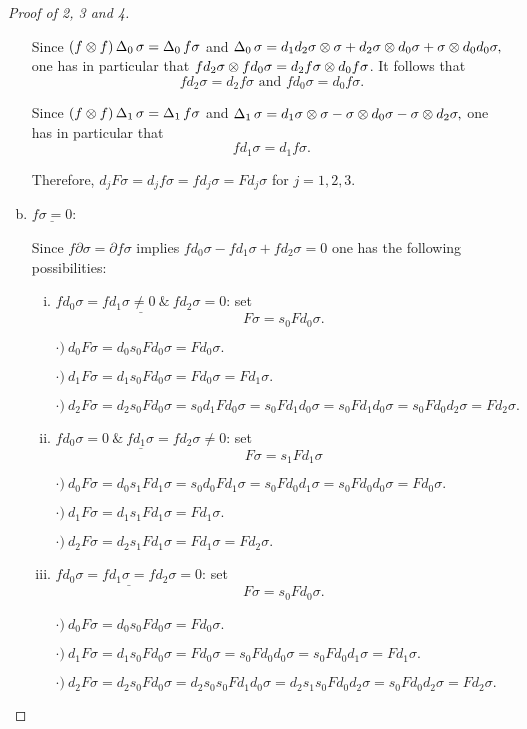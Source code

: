 \documentclass[thesis.tex]{subfiles}
\begin{document}
\begin{proof}[Proof of 2, 3 and 4]
\begin{enumerate}[a)]
    Since $(f\otimes f)\operatorname{\Delta}_0\sigma=\operatorname{\Delta}_0f\sigma$ and
    $\operatorname{\Delta}_0\sigma=d_1d_2\sigma\otimes\sigma + d_2\sigma\otimes d_0\sigma + \sigma\otimes d_0d_0\sigma,$
    one has in particular that $fd_2\sigma\otimes fd_0\sigma=d_2f\sigma\otimes d_0f\sigma$. It follows that $$fd_2\sigma=d_2f\sigma \text{ and } fd_0\sigma=d_0f\sigma.$$

    Since $(f\otimes f)\operatorname{\Delta}_1\sigma=\operatorname{\Delta}_1f\sigma$ and
    $\operatorname{\Delta}_1\sigma=d_1\sigma\otimes\sigma - \sigma\otimes d_0\sigma - \sigma\otimes d_2\sigma,$
    one has in particular that $$fd_1\sigma=d_1f\sigma.$$

    Therefore, $d_jF\sigma=d_jf\sigma=fd_j\sigma=Fd_j\sigma$ for $j=1,2,3$. \par

    \item $\underline{f\sigma=0}$: \vspace*{5pt}\par

    Since $f\partial\sigma=\partial f\sigma$ implies $fd_0\sigma-fd_1\sigma+fd_2\sigma=0$ one has the following possibilities:

        \begin{enumerate}[i)]

        \item $\underline{fd_0\sigma=fd_1\sigma\neq0\ \&\ fd_2\sigma=0}$: set $$F\sigma=s_0Fd_0\sigma.$$

        $\cdot)\ d_0F\sigma=d_0s_0Fd_0\sigma=Fd_0\sigma.$\par
        $\cdot)\ d_1F\sigma=d_1s_0Fd_0\sigma=Fd_0\sigma=Fd_1\sigma.$\par
        $\cdot)\ d_2F\sigma=d_2s_0Fd_0\sigma=s_0d_1Fd_0\sigma=s_0Fd_1d_0\sigma=s_0Fd_1d_0\sigma=s_0Fd_0d_2\sigma=Fd_2\sigma.$

        \item $\underline{fd_0\sigma=0\ \&\ fd_1\sigma=fd_2\sigma\neq0}$: set $$F\sigma=s_1Fd_1\sigma$$

        $\cdot)\ d_0F\sigma=d_0s_1Fd_1\sigma=s_0d_0Fd_1\sigma=s_0Fd_0d_1\sigma=s_0Fd_0d_0\sigma=Fd_0\sigma.$\par
        $\cdot)\ d_1F\sigma=d_1s_1Fd_1\sigma=Fd_1\sigma.$\par
        $\cdot)\ d_2F\sigma=d_2s_1Fd_1\sigma=Fd_1\sigma=Fd_2\sigma.$

        \item $\underline{fd_0\sigma=fd_1\sigma=fd_2\sigma=0}$: set $$F\sigma=s_0Fd_0\sigma.$$

        $\cdot)\ d_0F\sigma=d_0s_0Fd_0\sigma=Fd_0\sigma$.\par
        $\cdot)\ d_1F\sigma=d_1s_0Fd_0\sigma=Fd_0\sigma=s_0Fd_0d_0\sigma=s_0Fd_0d_1\sigma=Fd_1\sigma.$\par
        $\cdot)\ d_2F\sigma=d_2s_0Fd_0\sigma=d_2s_0s_0Fd_1d_0\sigma=d_2s_1s_0Fd_0d_2\sigma=s_0Fd_0d_2\sigma=Fd_2\sigma.$


\end{enumerate}
\end{enumerate}
\end{proof}
\end{document}
